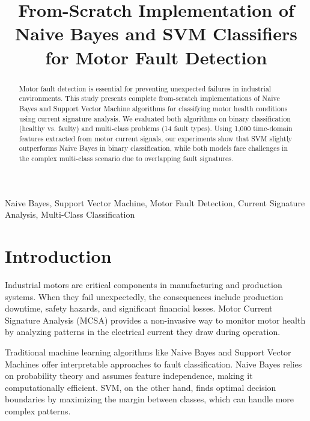 \documentclass[conference]{IEEEtran}
\begin{document}
\title{From-Scratch Implementation of Naive Bayes and SVM Classifiers for Motor Fault Detection}

\author{
}

\maketitle

\begin{abstract}
Motor fault detection is essential for preventing unexpected failures in industrial environments. This study presents complete from-scratch implementations of Naive Bayes and Support Vector Machine algorithms for classifying motor health conditions using current signature analysis. We evaluated both algorithms on binary classification (healthy vs. faulty) and multi-class problems (14 fault types). Using 1,000 time-domain features extracted from motor current signals, our experiments show that SVM slightly outperforms Naive Bayes in binary classification, while both models face challenges in the complex multi-class scenario due to overlapping fault signatures.
\end{abstract}

\begin{IEEEkeywords}
Naive Bayes, Support Vector Machine, Motor Fault Detection, Current Signature Analysis, Multi-Class Classification
\end{IEEEkeywords}

\section{Introduction}
Industrial motors are critical components in manufacturing and production systems. When they fail unexpectedly, the consequences include production downtime, safety hazards, and significant financial losses. Motor Current Signature Analysis (MCSA) provides a non-invasive way to monitor motor health by analyzing patterns in the electrical current they draw during operation.

Traditional machine learning algorithms like Naive Bayes and Support Vector Machines offer interpretable approaches to fault classification. Naive Bayes relies on probability theory and assumes feature independence, making it computationally efficient. SVM, on the other hand, finds optimal decision boundaries by maximizing the margin between classes, which can handle more complex patterns.
\end{document}
